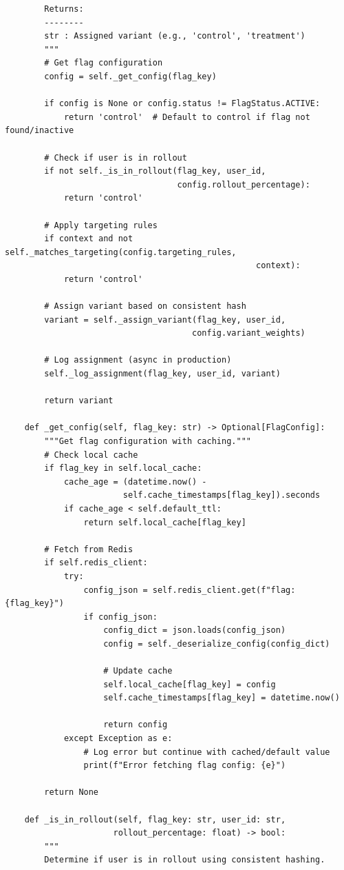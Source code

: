 \begin{lstlisting}
        Returns:
        --------
        str : Assigned variant (e.g., 'control', 'treatment')
        """
        # Get flag configuration
        config = self._get_config(flag_key)

        if config is None or config.status != FlagStatus.ACTIVE:
            return 'control'  # Default to control if flag not found/inactive

        # Check if user is in rollout
        if not self._is_in_rollout(flag_key, user_id,
                                   config.rollout_percentage):
            return 'control'

        # Apply targeting rules
        if context and not self._matches_targeting(config.targeting_rules,
                                                   context):
            return 'control'

        # Assign variant based on consistent hash
        variant = self._assign_variant(flag_key, user_id,
                                      config.variant_weights)

        # Log assignment (async in production)
        self._log_assignment(flag_key, user_id, variant)

        return variant

    def _get_config(self, flag_key: str) -> Optional[FlagConfig]:
        """Get flag configuration with caching."""
        # Check local cache
        if flag_key in self.local_cache:
            cache_age = (datetime.now() -
                        self.cache_timestamps[flag_key]).seconds
            if cache_age < self.default_ttl:
                return self.local_cache[flag_key]

        # Fetch from Redis
        if self.redis_client:
            try:
                config_json = self.redis_client.get(f"flag:{flag_key}")
                if config_json:
                    config_dict = json.loads(config_json)
                    config = self._deserialize_config(config_dict)

                    # Update cache
                    self.local_cache[flag_key] = config
                    self.cache_timestamps[flag_key] = datetime.now()

                    return config
            except Exception as e:
                # Log error but continue with cached/default value
                print(f"Error fetching flag config: {e}")

        return None

    def _is_in_rollout(self, flag_key: str, user_id: str,
                      rollout_percentage: float) -> bool:
        """
        Determine if user is in rollout using consistent hashing.


\end{lstlisting}
